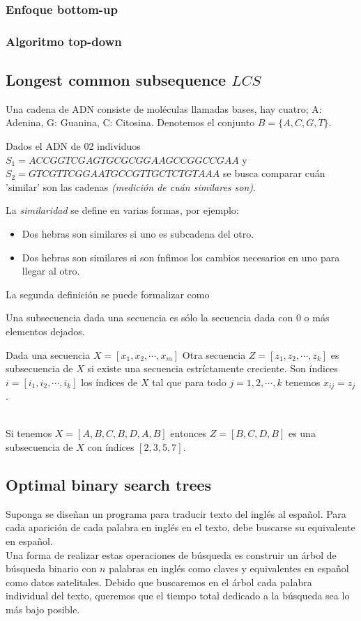 \subsubsection{Enfoque bottom-up}


\subsubsection{Algoritmo top-down}


\subsection{Longest common subsequence $LCS$}
Una cadena de ADN consiste de moléculas llamadas bases, hay cuatro; A: Adenina, G: Guanina, C: Citosina. Denotemos el conjunto $B=\{A,C,G,T\}$.


Dados el ADN de 02 individuos $S_1=ACCGGTCGAGTGCGCGGAAGCCGGCCGAA$ y $S_2=GTCGTTCGGAATGCCGTTGCTCTGTAAA$ se busca comparar cuán 'similar' son las cadenas \textit{(medición de cuán similares son)}.

La \textit{similaridad} se define en varias formas, por ejemplo:
\begin{itemize}
	\item Dos hebras son similares si uno es subcadena del otro.
	\item Dos hebras son similares si son ínfimos los cambios necesarios en uno para llegar al otro.
\end{itemize}
La segunda definición se puede formalizar como
\begin{definition}[Formalmente]
	Una subsecuencia dada una secuencia es sólo la secuencia dada con 0 o más elementos dejados.

	Dada una secuencia $X=[x_1,x_2,\cdots,x_m]$
	Otra secuencia $Z=[z_1,z_2,\cdots,z_k]$ es subsecuencia de $X$ si existe una secuencia estríctamente creciente.
	Son índices $i=[i_1,i_2,\cdots,i_k]$ los índices de $X$ tal que para todo $j=1,2,\cdots,k$ tenemos $x_{ij}=z_j$.
\end{definition}
\begin{example}[]~\\
	Si tenemos $X=[A,B,C,B,D,A,B]$ entonces $Z=[B,C,D,B]$ es una subsecuencia de $X$ con índices $[2,3,5,7]$.
\end{example}


\subsection{Optimal binary search trees}
Suponga se diseñan un programa para traducir texto del inglés al español.
Para cada aparición de cada palabra en inglés en el texto, debe buscarse su equivalente en español.\\
Una forma de realizar estas operaciones de búsqueda es construir un árbol de búsqueda binario con $n$ palabras en inglés como claves y equivalentes en español como datos satelitales.
Debido que buscaremos en el árbol cada palabra individual del texto, queremos que el tiempo total dedicado a la búsqueda sea lo más bajo posible.

